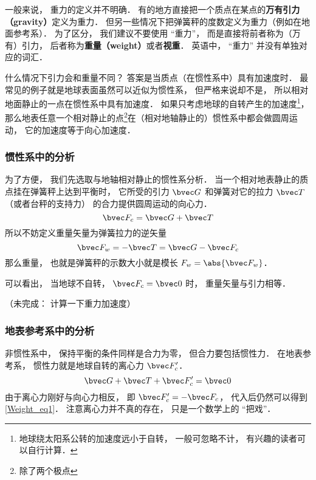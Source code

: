 

一般来说， 重力的定义并不明确． 有的地方直接把一个质点在某点的\textbf{万有引力（gravity）}定义为重力． 但另一些情况下把弹簧秤的度数定义为重力（例如在地面参考系）． 为了区分， 我们建议不要使用 “重力”， 而是直接将前者称为（万有）引力， 后者称为\textbf{重量（weight）}或者\textbf{视重}． 英语中， “重力” 并没有单独对应的词汇．

什么情况下引力会和重量不同？ 答案是当质点（在惯性系中）具有加速度时． 最常见的例子就是地球表面虽然可以近似为惯性系， 但严格来说却不是， 所以相对地面静止的一点在惯性系中具有加速度． 如果只考虑地球的自转产生的加速度\footnote{地球绕太阳系公转的加速度远小于自转， 一般可忽略不计， 有兴趣的读者可以自行计算．}， 那么地表任意一个相对静止的点\footnote{除了两个极点}在（相对地轴静止的）惯性系中都会做圆周运动， 它的加速度等于向心加速度．

\subsubsection{惯性系中的分析}
为了方便， 我们先选取与地轴相对静止的惯性系分析． 当一个相对地表静止的质点挂在弹簧秤上达到平衡时， 它所受的引力 $\bvec G$ 和弹簧对它的拉力 $\bvec T$（或者台秤的支持力） 的合力提供圆周运动的向心力．
\begin{equation}\label{Weight_eq1}
\bvec F_c = \bvec G + \bvec T
\end{equation}
所以不妨定义重量矢量为弹簧拉力的逆矢量
\begin{equation}
\bvec F_w = -\bvec T = \bvec G - \bvec F_c
\end{equation}
那么重量， 也就是弹簧秤的示数大小就是模长 $F_w = \abs{\bvec F_w}$．

可以看出， 当地球不自转， $\bvec F_c = \bvec 0$ 时， 重量矢量与引力相等．

（未完成： 计算一下重力加速度）

\subsubsection{地表参考系中的分析}
非惯性系中， 保持平衡的条件同样是合力为零， 但合力要包括惯性力． 在地表参考系， 惯性力就是地球自转的离心力 $\bvec F'_c$．
\begin{equation}
\bvec G + \bvec T + \bvec F'_c = \bvec 0
\end{equation}
由于离心力刚好与向心力相反， 即 $\bvec F'_c = -\bvec F_c$， 代入后仍然可以得到\autoref{Weight_eq1}． 注意离心力并不真的存在， 只是一个数学上的 “把戏”．
